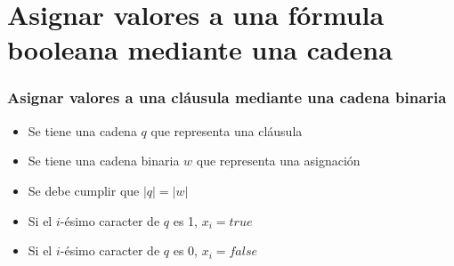 \documentclass{beamer}
\begin{document}
\section{Asignar valores a una fórmula booleana mediante una cadena}

\begin{frame}
    \frametitle{Asignar valores a una cláusula mediante una cadena binaria}
    
    \begin{itemize}
        \item Se tiene una cadena $q$ que representa una cláusula
              \pause
        \item Se tiene una cadena binaria $w$ que representa una asignación
              \pause
        \item Se debe cumplir que $|q|=|w|$
              \pause
        \item Si el $i$-ésimo caracter de $q$ es 1, $x_i=true$
              \pause
        \item Si el $i$-ésimo caracter de $q$ es 0, $x_i=false$
    \end{itemize}
    
\end{frame}
\end{document}
